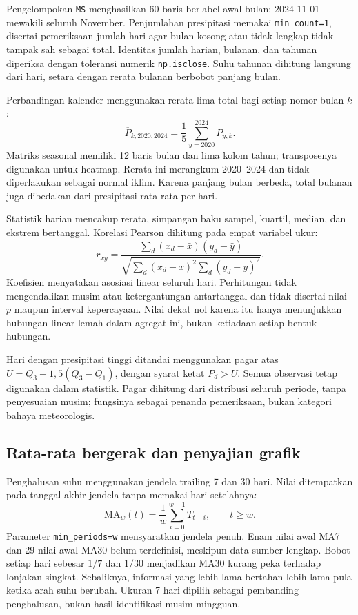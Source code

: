 \documentclass[12pt,a4paper]{article}
\begin{document}
Pengelompokan \texttt{MS} menghasilkan 60 baris berlabel awal bulan; 2024-11-01 mewakili seluruh November. Penjumlahan presipitasi memakai \texttt{min\_count=1}, disertai pemeriksaan jumlah hari agar bulan kosong atau tidak lengkap tidak tampak sah sebagai total. Identitas jumlah harian, bulanan, dan tahunan diperiksa dengan toleransi numerik \texttt{np.isclose}. Suhu tahunan dihitung langsung dari hari, setara dengan rerata bulanan berbobot panjang bulan.

Perbandingan kalender menggunakan rerata lima total bagi setiap nomor bulan $k$:
\begin{equation}
\overline{P}_{k,2020:2024}=\frac{1}{5}\sum_{y=2020}^{2024}P_{y,k}.
\end{equation}
Matriks seasonal memiliki 12 baris bulan dan lima kolom tahun; transposenya digunakan untuk heatmap. Rerata ini merangkum 2020--2024 dan tidak diperlakukan sebagai normal iklim. Karena panjang bulan berbeda, total bulanan juga dibedakan dari presipitasi rata-rata per hari.

Statistik harian mencakup rerata, simpangan baku sampel, kuartil, median, dan ekstrem bertanggal. Korelasi Pearson dihitung pada empat variabel ukur:
\begin{equation}
r_{xy}=\frac{\sum_d(x_d-\bar{x})(y_d-\bar{y})}{\sqrt{\sum_d(x_d-\bar{x})^2\sum_d(y_d-\bar{y})^2}}.
\end{equation}
Koefisien menyatakan asosiasi linear seluruh hari. Perhitungan tidak mengendalikan musim atau ketergantungan antartanggal dan tidak disertai nilai-$p$ maupun interval kepercayaan. Nilai dekat nol karena itu hanya menunjukkan hubungan linear lemah dalam agregat ini, bukan ketiadaan setiap bentuk hubungan.

Hari dengan presipitasi tinggi ditandai menggunakan pagar atas $U=Q_3+1{,}5(Q_3-Q_1)$, dengan syarat ketat $P_d>U$. Semua observasi tetap digunakan dalam statistik. Pagar dihitung dari distribusi seluruh periode, tanpa penyesuaian musim; fungsinya sebagai penanda pemeriksaan, bukan kategori bahaya meteorologis.

\subsection{Rata-rata bergerak dan penyajian grafik}
Penghalusan suhu menggunakan jendela trailing 7 dan 30 hari. Nilai ditempatkan pada tanggal akhir jendela tanpa memakai hari setelahnya:
\begin{equation}
\mathrm{MA}_{w}(t)=\frac{1}{w}\sum_{i=0}^{w-1}T_{t-i},\qquad t\geq w.
\end{equation}
Parameter \texttt{min\_periods=w} mensyaratkan jendela penuh. Enam nilai awal MA7 dan 29 nilai awal MA30 belum terdefinisi, meskipun data sumber lengkap. Bobot setiap hari sebesar $1/7$ dan $1/30$ menjadikan MA30 kurang peka terhadap lonjakan singkat. Sebaliknya, informasi yang lebih lama bertahan lebih lama pula ketika arah suhu berubah. Ukuran 7 hari dipilih sebagai pembanding penghalusan, bukan hasil identifikasi musim mingguan.
\end{document}
